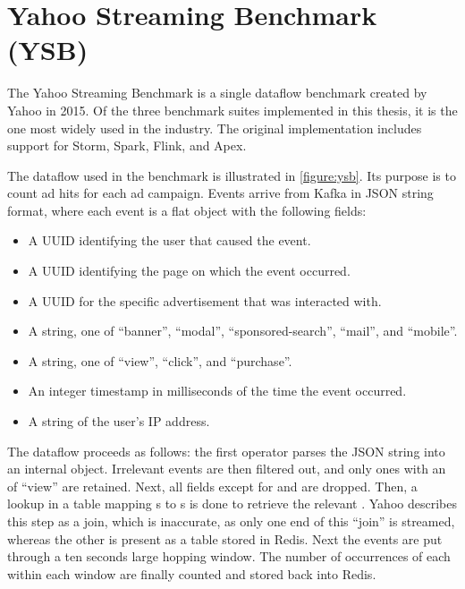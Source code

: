 \section{Yahoo Streaming Benchmark (YSB)\cite{ysb}}
The Yahoo Streaming Benchmark is a single dataflow benchmark created by Yahoo in 2015. Of the three benchmark suites implemented in this thesis, it is the one most widely used in the industry. The original implementation includes support for Storm, Spark, Flink, and Apex. \\


The dataflow used in the benchmark is illustrated in \autoref{figure:ysb}. Its purpose is to count ad hits for each ad campaign. Events arrive from Kafka in JSON string format, where each event is a flat object with the following fields:

\begin{itemize}
\item {} A UUID identifying the user that caused the event.
\item {} A UUID identifying the page on which the event occurred.
\item {} A UUID for the specific advertisement that was interacted with.
\item {} A string, one of ``banner'', ``modal'', ``sponsored-search'', ``mail'', and ``mobile''.
\item {} A string, one of ``view'', ``click'', and ``purchase''.
\item {} An integer timestamp in milliseconds of the time the event occurred.
\item {} A string of the user's IP address.
\end{itemize}

The dataflow proceeds as follows: the first operator parses the JSON string into an internal object. Irrelevant events are then filtered out, and only ones with an  of ``view'' are retained. Next, all fields except for  and  are dropped. Then, a lookup in a table mapping s to s is done to retrieve the relevant . Yahoo describes this step as a join, which is inaccurate, as only one end of this ``join'' is streamed, whereas the other is present as a table stored in Redis. Next the events are put through a ten seconds large hopping window. The number of occurrences of each  within each window are finally counted and stored back into Redis.

